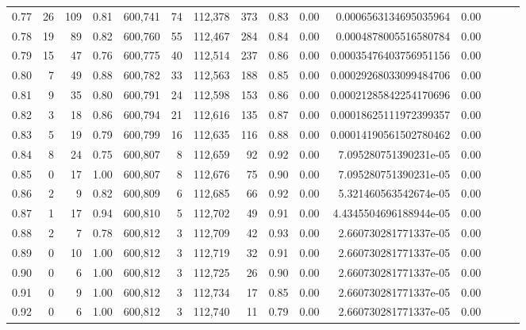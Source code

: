 \begin{tabular}{rrrrrrrrrrrrrrr}
0.77 &      26 &    109 &  0.81 &  600,741 &       74 &  112,378 &      373 &  0.83 &  0.00 &   0.0006563134695035964 &      0.00 \\
0.78 &      19 &     89 &  0.82 &  600,760 &       55 &  112,467 &      284 &  0.84 &  0.00 &   0.0004878005516580784 &      0.00 \\
0.79 &      15 &     47 &  0.76 &  600,775 &       40 &  112,514 &      237 &  0.86 &  0.00 &  0.00035476403756951156 &      0.00 \\
0.80 &       7 &     49 &  0.88 &  600,782 &       33 &  112,563 &      188 &  0.85 &  0.00 &  0.00029268033099484706 &      0.00 \\
0.81 &       9 &     35 &  0.80 &  600,791 &       24 &  112,598 &      153 &  0.86 &  0.00 &  0.00021285842254170696 &      0.00 \\
0.82 &       3 &     18 &  0.86 &  600,794 &       21 &  112,616 &      135 &  0.87 &  0.00 &  0.00018625111972399357 &      0.00 \\
0.83 &       5 &     19 &  0.79 &  600,799 &       16 &  112,635 &      116 &  0.88 &  0.00 &  0.00014190561502780462 &      0.00 \\
0.84 &       8 &     24 &  0.75 &  600,807 &        8 &  112,659 &       92 &  0.92 &  0.00 &   7.095280751390231e-05 &      0.00 \\
0.85 &       0 &     17 &  1.00 &  600,807 &        8 &  112,676 &       75 &  0.90 &  0.00 &   7.095280751390231e-05 &      0.00 \\
0.86 &       2 &      9 &  0.82 &  600,809 &        6 &  112,685 &       66 &  0.92 &  0.00 &   5.321460563542674e-05 &      0.00 \\
0.87 &       1 &     17 &  0.94 &  600,810 &        5 &  112,702 &       49 &  0.91 &  0.00 &  4.4345504696188944e-05 &      0.00 \\
0.88 &       2 &      7 &  0.78 &  600,812 &        3 &  112,709 &       42 &  0.93 &  0.00 &   2.660730281771337e-05 &      0.00 \\
0.89 &       0 &     10 &  1.00 &  600,812 &        3 &  112,719 &       32 &  0.91 &  0.00 &   2.660730281771337e-05 &      0.00 \\
0.90 &       0 &      6 &  1.00 &  600,812 &        3 &  112,725 &       26 &  0.90 &  0.00 &   2.660730281771337e-05 &      0.00 \\
0.91 &       0 &      9 &  1.00 &  600,812 &        3 &  112,734 &       17 &  0.85 &  0.00 &   2.660730281771337e-05 &      0.00 \\
0.92 &       0 &      6 &  1.00 &  600,812 &        3 &  112,740 &       11 &  0.79 &  0.00 &   2.660730281771337e-05 &      0.00 \\

\end{tabular}
